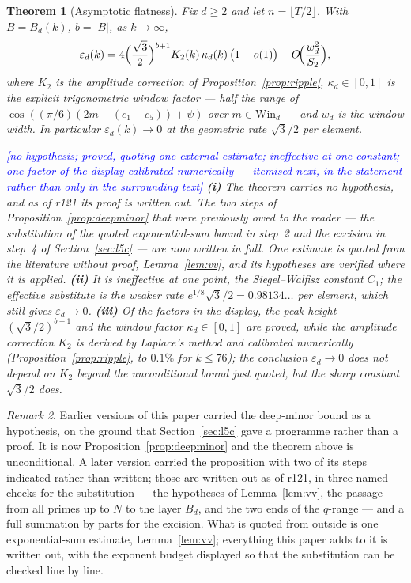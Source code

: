 \documentclass[11pt,a4paper]{article}
\theoremstyle{plain}
\newtheorem{theorem}{Theorem}[section]
\theoremstyle{definition}
\theoremstyle{remark}
\newtheorem{remark}[theorem]{Remark}
\newcommand{\STATUS}[1]{\textcolor{blue}{\textsf{[#1]}}}
\begin{document}
\begin{theorem}[Asymptotic flatness]\label{thm:t2main}
Fix $d\ge2$ and let
$n=\lfloor T/2\rfloor$. With
$B=B_d(k)$, $b=|B|$, as $k\to\infty$,
\[
  \varepsilon_d(k)=4\Bigl(\frac{\sqrt3}{2}\Bigr)^{b+1}K_2(k)\,\kappa_d(k)\,
  \bigl(1+o(1)\bigr)+O\!\Bigl(\frac{w_d^{2}}{S_2}\Bigr),
\]
where $K_2$ is the amplitude correction of Proposition~\ref{prop:ripple},
$\kappa_d\in[0,1]$ is the explicit trigonometric window factor --- half the
range of $\cos((\pi/6)(2m-(c_1-c_5))+\psi)$ over $m\in\mathrm{Win}_d$ --- and
$w_d$ is the window width. In particular $\varepsilon_d(k)\to0$ at the
geometric rate $\sqrt3/2$ per element.

\STATUS{no hypothesis; proved, quoting one external estimate; ineffective at one constant;
one factor of the display calibrated numerically --- itemised next, in the statement rather
than only in the surrounding text}
\textbf{(i)} The
theorem carries no hypothesis, and as of r121 its proof is written out. The two steps of
Proposition~\ref{prop:deepminor} that were previously owed to the reader --- the substitution
of the quoted exponential-sum bound in step~2 and the excision in step~4 of
Section~\ref{sec:l5c} --- are now written in full. One estimate is quoted from the literature
without proof, Lemma~\ref{lem:vv}, and its hypotheses are verified where it is applied. \textbf{(ii)} It is ineffective at one point, the Siegel--Walfisz constant $C_1$;
the effective substitute is the weaker rate $e^{1/8}\sqrt3/2=0.98134\ldots$ per element, which
still gives $\varepsilon_d\to0$. \textbf{(iii)} Of the factors in the display, the peak height
$(\sqrt3/2)^{b+1}$ and the window factor $\kappa_d\in[0,1]$ are proved, while the amplitude
correction $K_2$ is derived by Laplace's method and \emph{calibrated numerically}
(Proposition~\ref{prop:ripple}, to $0.1\%$ for $k\le76$); the conclusion
$\varepsilon_d\to0$ does not depend on $K_2$ beyond the unconditional bound just quoted, but
the sharp constant $\sqrt3/2$ does.
\end{theorem}

\begin{remark}
Earlier versions of this paper carried the deep-minor bound as a hypothesis,
on the ground that Section~\ref{sec:l5c} gave a programme rather than a proof.
It is now Proposition~\ref{prop:deepminor} and the theorem above is
unconditional. A later version carried the proposition with two of its steps
indicated rather than written; those are written out as of r121, in three named
checks for the substitution --- the hypotheses of Lemma~\ref{lem:vv}, the
passage from all primes up to $N$ to the layer $B_d$, and the two ends of the
$q$-range --- and a full summation by parts for the excision. What is quoted
from outside is one exponential-sum estimate, Lemma~\ref{lem:vv}; everything
this paper adds to it is written out, with the exponent budget displayed so that
the substitution can be checked line by line.
\end{remark}
\end{document}
